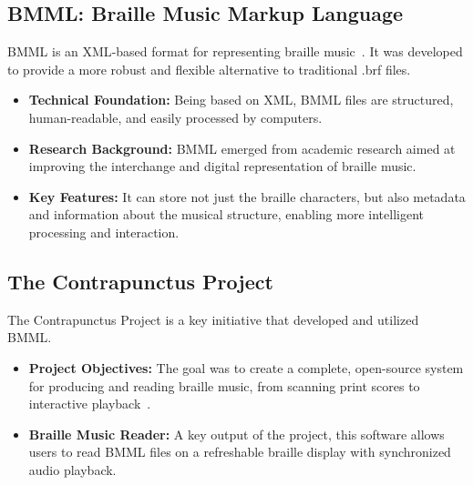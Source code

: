 \subsection{BMML: Braille Music Markup Language}\label{ch10:ssec:bmml}
\gls{BMML} is an \gls{XML}-based format for representing braille music~\supercite{braillemuse}. It was developed to provide a more robust and flexible alternative to traditional .brf files.
\begin{itemize}
	\item \textbf{Technical Foundation:} Being based on \gls{XML}, \gls{BMML} files are structured, human-readable, and easily processed by computers.
	\item \textbf{Research Background:} \gls{BMML} emerged from academic research aimed at improving the interchange and digital representation of braille music.
	\item \textbf{Key Features:} It can store not just the braille characters, but also metadata and information about the musical structure, enabling more intelligent processing and interaction.
\end{itemize}

\subsection{The Contrapunctus Project}\label{ch10:ssec:contrapunctus-project}
The Contrapunctus Project is a key initiative that developed and utilized \gls{BMML}.
\begin{itemize}
	\item \textbf{Project Objectives:} The goal was to create a complete, open-source system for producing and reading braille music, from scanning print scores to interactive playback~\supercite{braillemuse}.
	\item \textbf{Braille Music Reader:} A key output of the project, this software allows users to read \gls{BMML} files on a refreshable braille display with synchronized audio playback.
\end{itemize}

